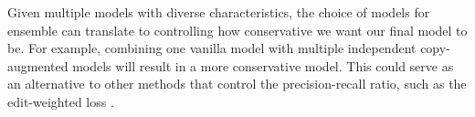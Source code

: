 \documentclass[11pt,a4paper]{article}
\begin{document}
Given multiple models with diverse characteristics, the choice of models for ensemble can translate to controlling how conservative we want our final model to be.
For example, combining one vanilla model with multiple independent copy-augmented models will result in a more conservative model.
This could serve as an alternative to other methods that control the precision-recall ratio, such as the edit-weighted loss \cite{junczys2018approaching}.
\end{document}
